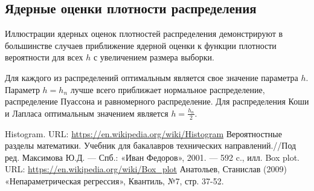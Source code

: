 \documentclass[a4paper,14pt]{article}
\begin{document}
	\subsection{Ядерные оценки плотности распределения}
	Иллюстрации ядерных оценок плотностей распределения демонстрируют в большинстве случаев приближение ядерной оценки к функции плотности вероятности для всех $h$ с увеличением размера выборки. 
	
	Для каждого из распределений оптимальным является свое значение параметра $h$. Параметр $h=h_n$ лучше всего приближает нормальное распределение, распределение Пуассона и равномерного распределение. Для распределения Коши и Лапласа оптимальным значением является $h=\frac{h_n}{2}$.
	

	\newpage
	
	\begin{thebibliography}{4}
		Histogram. URL: \url{https://en.wikipedia.org/wiki/Histogram}
		Вероятностные разделы математики. Учебник для бакалавров технических направлений.//Под ред. Максимова Ю.Д. --- Спб.: «Иван Федоров», 2001. --- 592 c., илл.
		Box plot. URL: \url{https://en.wikipedia.org/wiki/Box_plot}
		Анатольев, Станислав (2009) «Непараметрическая регрессия», Квантиль, №7, стр. 37-52.
	\end{thebibliography}
\end{document}
